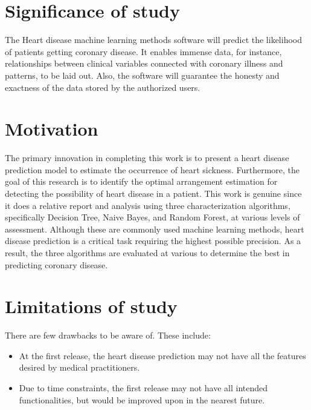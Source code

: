 \section{Significance of study}
The Heart disease machine learning methods software will predict the likelihood of patients getting coronary disease. It enables immense data, for instance, relationships between clinical variables connected with coronary illness and patterns, to be laid out. Also, the software will guarantee the honesty and exactness of the data stored by the authorized users. 

\section{Motivation}
The primary innovation in completing this work is to present a heart disease prediction model to estimate the occurrence of heart sickness. Furthermore, the goal of this research is to identify the optimal arrangement estimation for detecting the possibility of heart disease in a patient. This work is genuine since it does a relative report and analysis using three characterization algorithms, specifically Decision Tree, Naive Bayes, and Random Forest, at various levels of assessment. Although these are commonly used machine learning methods, heart disease prediction is a critical task requiring the highest possible precision. As a result, the three algorithms are evaluated at various to determine the best in predicting coronary disease.



\section{Limitations of study}
There are few drawbacks to be aware of. These include:
\begin{itemize}
	\item{At the first release, the heart disease prediction may not have all the features desired by medical practitioners.}
	\item{Due to time constraints, the first release may not have all intended functionalities, but would be improved upon in the nearest future.}
\end{itemize}